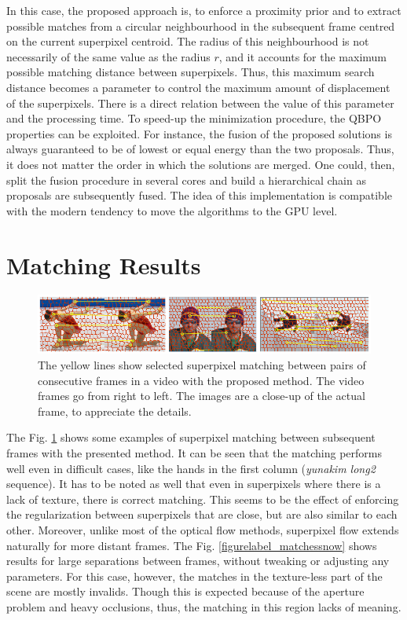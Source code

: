In this case, the proposed approach is, to enforce a proximity prior and to extract possible matches from 
a circular neighbourhood in the subsequent frame centred on the current superpixel centroid. The radius of this neighbourhood is not necessarily 
of the same value as the radius $r$, and it accounts for the maximum possible matching distance between superpixels. Thus, this maximum search distance becomes a parameter to control the maximum 
amount of displacement of the superpixels. There is a direct relation between the value of this 
parameter and the processing time.
To speed-up the minimization procedure, the QBPO properties can be exploited. For instance, the fusion of the
proposed solutions is always guaranteed to be of lowest or equal energy than the two proposals. Thus, it does not matter the order in which the solutions are merged. 
One could, then, split the fusion procedure in several cores and build a hierarchical chain as proposals are subsequently fused. The idea of this implementation is compatible with 
the modern tendency to move the algorithms to the GPU level.

\section{Matching Results}

   \begin{figure}[thpb]
      \centering
      \includegraphics[width=1.00\textwidth]{../images/matches.png}
      \caption{The yellow lines show selected superpixel
		matching between pairs of consecutive frames in a video
		with the proposed method. The video frames go from right
		to left. The images are a close-up of the actual frame, to 
		appreciate the details.}
      \label{figurelabel_matches}
   \end{figure}
	
The Fig. \ref{figurelabel_matches} shows some examples of superpixel matching between subsequent frames with the presented method. 
It can be seen that the matching performs well even in difficult cases, like the hands in the first column ({\it yunakim long2} sequence). It has to be noted
as well that even in superpixels where there is a lack of texture, there is correct matching. This seems to be
the effect of enforcing the regularization between superpixels that are close, but are also similar to
each other. Moreover, unlike most of the optical flow methods, superpixel flow extends 
 naturally for more distant frames. 
The Fig. \ref{figurelabel_matchessnow} shows
 results for large separations between frames, without tweaking or adjusting any parameters. 
For this case, however, the matches in the texture-less part of the scene
 are mostly invalids. Though this is expected because of the aperture problem and
 heavy occlusions, thus, the matching in this region lacks of meaning.

